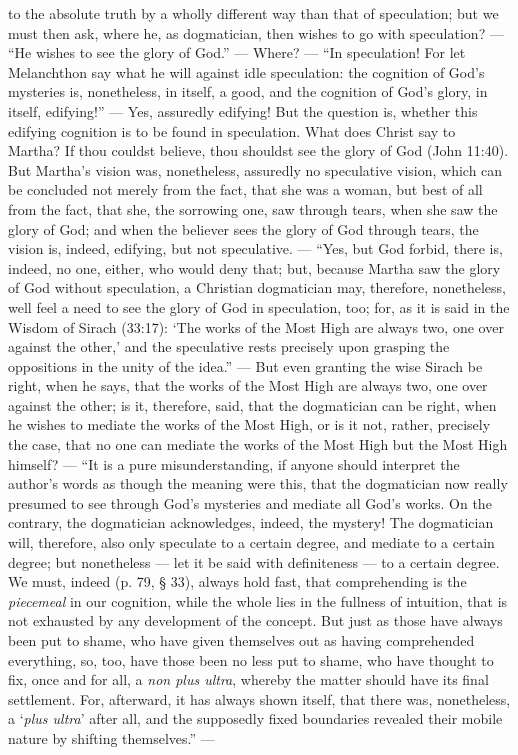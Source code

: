 \documentclass[12pt]{book}
\begin{document}
to the absolute truth by a wholly different way than that of speculation; but we must then ask, where he, as dogmatician, then wishes to go with speculation? --- ``He wishes to see the glory of God.'' --- Where? --- ``In speculation! For let Melanchthon say what he will against idle speculation: the cognition of God's mysteries is, nonetheless, in itself, a good, and the cognition of God's glory, in itself, edifying!'' --- Yes, assuredly edifying! But the question is, whether this edifying cognition is to be found in speculation. What does Christ say to Martha? If thou couldst believe, thou shouldst see the glory of God (John 11:40). But Martha's vision was, nonetheless, assuredly no speculative vision, which can be concluded not merely from the fact, that she was a woman, but best of all from the fact, that she, the sorrowing one, saw through tears, when she saw the glory of God; and when the believer sees the glory of God through tears, the vision is, indeed, edifying, but not speculative. --- ``Yes, but God forbid, there is, indeed, no one, either, who would deny that; but, because Martha saw the glory of God without speculation, a Christian dogmatician may, therefore, nonetheless, well feel a need to see the glory of God in speculation, too; for, as it is said in the Wisdom of Sirach (33:17): `The works of the Most High are always two, one over against the other,' and the speculative rests precisely upon grasping the oppositions in the unity of the idea.'' --- But even granting the wise Sirach be right, when he says, that the works of the Most High are always two, one over against
the other; is it, therefore, said, that the dogmatician can be right, when he wishes to mediate the works of the Most High, or is it not, rather, precisely the case, that no one can mediate the works of the Most High but the Most High himself? --- ``It is a pure misunderstanding, if anyone should interpret the author's words as though the meaning were this, that the dogmatician now really presumed to see through God's mysteries and mediate all God's works. On the contrary, the dogmatician acknowledges, indeed, the mystery! The dogmatician will, therefore, also only speculate to a certain degree, and mediate to a certain degree; but nonetheless --- let it be said with definiteness --- to a certain degree. We must, indeed (p. 79, § 33), always hold fast, that comprehending is the \emph{piecemeal} in our cognition, while the whole lies in the fullness of intuition, that is not exhausted by any development of the concept. But just as those have always been put to shame, who have given themselves out as having comprehended everything, so, too, have those been no less put to shame, who have thought to fix, once and for all, a \textit{non plus ultra}, whereby the matter should have its final settlement. For, afterward, it has always shown itself, that there was, nonetheless, a `\textit{plus ultra}' after all, and the supposedly fixed boundaries revealed their mobile nature by shifting themselves.'' ---
\end{document}
